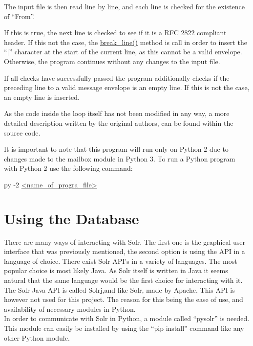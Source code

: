 \documentclass[a4paper,english]{report}
\begin{document}
The input file is then read line by line, and each line is checked for the existence of “From”.






 If this is true, the next line is checked to see if it is a RFC 2822 \cite{RFC2822} compliant header. If this not the case, the \url{break_line()} method is call in order to insert the “|” character at the start of the current line, as this cannot be a valid envelope. Otherwise, the program continues without any changes to the input file.





If all checks have successfully passed the program additionally checks if the preceding line to a valid message envelope is an empty line. If this is not the case, an empty line is inserted.





As the code inside the loop itself has not been modified in any way, a more detailed description written by the original authors, can be found within the source code.


It is important to note that this program will run only on Python 2 due to changes made to the mailbox  module in Python 3.
To run a Python program with Python 2 use the following command:

py -2 \url{<name_of_progra_file>}


\chapter{Using the Database}

There are many ways of interacting with Solr. The first one is the graphical user interface that was previously mentioned, the second option is using the API in a language of choice. There exist Solr API’s in a variety of languages. The most popular choice is most likely Java. As Solr itself is written in Java it seems natural that the same language would be the first choice for interacting with it. The Solr Java API is called Solrj,and like Solr, made by Apache.
This API is however not used for this project. The reason for this being the ease of use, and availability of necessary modules in Python.\\
 In order to communicate with Solr in Python, a module called “pysolr” is needed. This module can easily be installed by using the “pip install” command like any other Python module.
\end{document}
